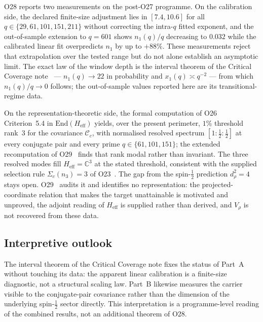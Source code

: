 \documentclass[11pt,a4paper]{article}
\theoremstyle{definition}
\begin{document}
  O28 reports two measurements on the post-O27 programme.
  On the calibration side, the declared finite-size adjustment lies in $[7.4, 10.6]$ for all
  $q \in \{29, 61, 101, 151, 211\}$ without correcting the intra-$q$ fitted exponent, and the
  out-of-sample extension to $q = 601$ shows $n_1(q)/q$
  decreasing to $0.032$ while the calibrated linear fit overpredicts $n_1$ by up to $+88\%$.
  These measurements reject that extrapolation over the tested range but do not alone establish an
  asymptotic limit.
  The exact law of the window depth is the interval theorem of the Critical Coverage
  note~\cite{Beau2026ccnote} --- $n_1(q) \to 22$ in probability and
  $x_1(q) \asymp q^{-2}$ --- from which $n_1(q)/q \to 0$ follows; the out-of-sample values reported
  here are its transitional-regime data.

  On the representation-theoretic side, the formal computation of O26 Criterion~5.4
  in $\mathrm{End}(H_{\mathrm{eff}})$ yields, over the present perimeter, $1\%$ threshold rank~$3$
  for the covariance $\mathcal{C}_c$, with normalised resolved spectrum
  $[1 : \tfrac{1}{2} : \tfrac{1}{2}]$ at every conjugate pair and every prime
  $q \in \{61, 101, 151\}$; the extended recomputation of O29~\cite{Beau2026a33} finds that rank
  modal rather than invariant.
  The three resolved modes fill $H_{\mathrm{eff}} = \mathbb{C}^3$ at the stated threshold,
  consistent with the supplied
  selection rule $\Sigma_c(n_3) = 3$ of O23~\cite{Beau2026a27}.
  The gap from the spin-$\tfrac{1}{2}$ prediction $d_\rho^2 = 4$ stays open.
  O29~\cite{Beau2026a33} audits it and identifies no representation: the projected-coordinate
  relation that makes the target unattainable is motivated and unproved, the adjoint reading of
  $H_{\mathrm{eff}}$ is supplied rather than derived, and $V_\rho$ is not recovered from these data.

  \subsection*{Interpretive outlook}

  The interval theorem of the Critical Coverage note fixes the status of Part~A without touching
  its data: the apparent linear calibration is a finite-size diagnostic, not a structural scaling
  law.
  Part~B likewise measures the carrier visible to the conjugate-pair covariance rather than the
  dimension of the underlying spin-$\tfrac{1}{2}$ sector directly.
  This interpretation is a programme-level reading of the combined results, not an additional
  theorem of O28.
\end{document}
